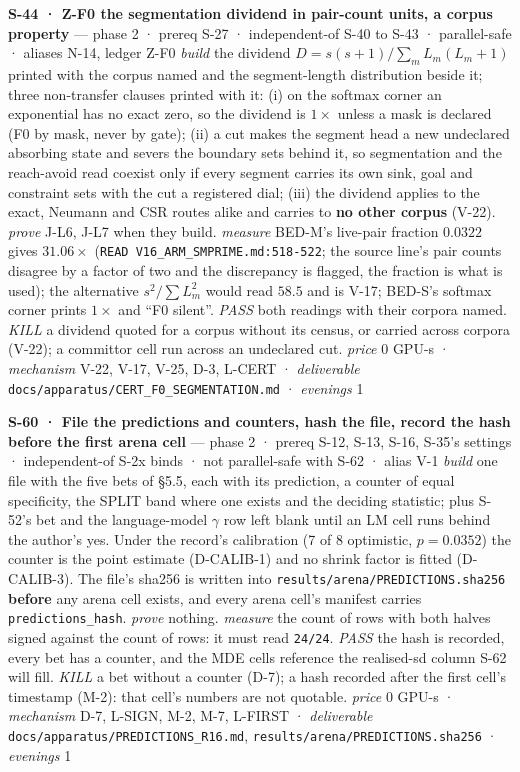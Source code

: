 \documentclass[11pt,a4paper]{article}
\theoremstyle{plain}
\theoremstyle{definition}
\theoremstyle{remark}
\begin{document}
\textbf{S-44 · Z-F0 the segmentation dividend in pair-count units, a
corpus property} --- phase 2 · prereq S-27 · independent-of S-40 to S-43
· parallel-safe · aliases N-14, ledger Z-F0 \emph{build} the dividend
\(D=s(s+1)/\sum_m L_m(L_m+1)\) printed with the corpus named and the
segment-length distribution beside it; three non-transfer clauses
printed with it: (i) on the softmax corner an exponential has no exact
zero, so the dividend is \(1\times\) unless a mask is declared (F0 by
mask, never by gate); (ii) a cut makes the segment head a new undeclared
absorbing state and severs the boundary sets behind it, so segmentation
and the reach-avoid read coexist only if every segment carries its own
sink, goal and constraint sets with the cut a registered dial; (iii) the
dividend applies to the exact, Neumann and CSR routes alike and carries
to \textbf{no other corpus} (V-22). \emph{prove} J-L6, J-L7 when they
build. \emph{measure} BED-M's live-pair fraction \(0.0322\) gives
\(31.06\times\) (\texttt{READ\ V16\_ARM\_SMPRIME.md:518-522}; the source
line's pair counts disagree by a factor of two and the discrepancy is
flagged, the fraction is what is used); the alternative
\(s^2/\sum L_m^2\) would read \(58.5\) and is V-17; BED-S's softmax
corner prints \(1\times\) and ``F0 silent''. \emph{PASS} both readings
with their corpora named. \emph{KILL} a dividend quoted for a corpus
without its census, or carried across corpora (V-22); a committor cell
run across an undeclared cut. \emph{price} \(0\) GPU-s ·
\emph{mechanism} V-22, V-17, V-25, D-3, L-CERT · \emph{deliverable}
\texttt{docs/apparatus/CERT\_F0\_SEGMENTATION.md} · \emph{evenings} 1

\textbf{S-60 · File the predictions and counters, hash the file, record
the hash before the first arena cell} --- phase 2 · prereq S-12, S-13,
S-16, S-35's settings · independent-of S-2x binds · not parallel-safe
with S-62 · alias V-1 \emph{build} one file with the five bets of §5.5,
each with its prediction, a counter of equal specificity, the SPLIT band
where one exists and the deciding statistic; plus S-52's bet and the
language-model \(\gamma\) row left blank until an LM cell runs behind
the author's yes. Under the record's calibration (7 of 8 optimistic,
\(p=0.0352\)) the counter is the point estimate (D-CALIB-1) and no
shrink factor is fitted (D-CALIB-3). The file's sha256 is written into
\texttt{results/arena/PREDICTIONS.sha256} \textbf{before} any arena cell
exists, and every arena cell's manifest carries
\texttt{predictions\_hash}. \emph{prove} nothing. \emph{measure} the
count of rows with both halves signed against the count of rows: it must
read \texttt{24/24}. \emph{PASS} the hash is recorded, every bet has a
counter, and the MDE cells reference the realised-sd column S-62 will
fill. \emph{KILL} a bet without a counter (D-7); a hash recorded after
the first cell's timestamp (M-2): that cell's numbers are not quotable.
\emph{price} \(0\) GPU-s · \emph{mechanism} D-7, L-SIGN, M-2, M-7,
L-FIRST · \emph{deliverable}
\texttt{docs/apparatus/PREDICTIONS\_R16.md},
\texttt{results/arena/PREDICTIONS.sha256} · \emph{evenings} 1
\end{document}
